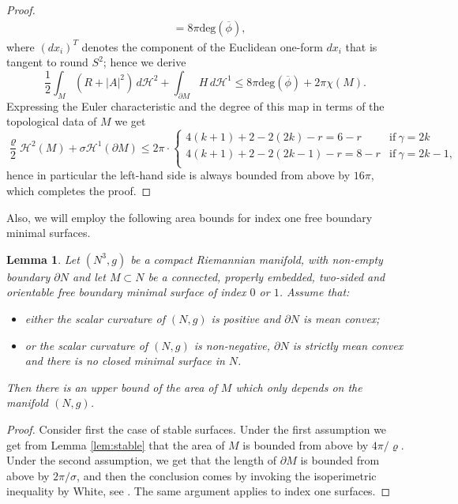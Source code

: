 \documentclass[10pt]{amsart}
\newcounter{cas}
\newtheorem{lem}[thm]{Lemma}
\theoremstyle{definition}
\newcommand{\h}{\mathscr{H}}
\begin{document}
\begin{proof}
\begin{align*}
&=8\pi \text{deg}(\overline{\phi}),
\end{align*}
where $(d x_i)^T$ denotes the component of the Euclidean one-form $dx_i$ that is tangent to round $S^2$; hence we derive
\[
\frac{1}{2}\int_{M}(R+|A|^2)\,d\h^2+\int_{\partial M}H\,d\h^1\leq 8\pi \text{deg}(\overline{\phi})+2\pi\chi(M).
\] Expressing the Euler characteristic and the degree of this map in terms of the topological data of $M$ we get
\[
\frac{\varrho}{2} \h^2(M)+\sigma \h^1(\partial M)\leq 2\pi \cdot
\begin{cases}
4(k+1)+2-2(2k)-r  = 6 -r & \text{if} \ \gamma=2k\\
4(k+1)+2-2(2k-1)-r  = 8 -r & \text{if} \ \gamma=2k-1,\\
\end{cases}
\]
hence in particular the left-hand side is always bounded from above by $16\pi$, which completes the proof.
\end{proof}

Also, we will employ the following area bounds for index one free boundary minimal surfaces.

\begin{lem}\label{lem:area}
Let $(N^3,g)$ be a compact Riemannian manifold, with non-empty boundary $\partial N$ and let $M\subset N$ be a connected, properly embedded, two-sided and orientable free boundary minimal surface of index $0$ or $1$.
Assume that:
\begin{itemize}
\item
\emph{either} the scalar curvature of $(N,g)$ is positive and $\partial N$ is mean convex;
\item
\emph{or} the scalar curvature of $(N,g)$ is non-negative, $\partial N$ is strictly mean convex and there is no \emph{closed} minimal surface in $N$.
\end{itemize}
Then there is an upper bound of the area of $M$ which only depends on the manifold $(N,g)$.
\end{lem}

\begin{proof}
Consider first the case of stable surfaces. Under the first assumption we get from Lemma \ref{lem:stable} that the area of $M$ is bounded from above by $4\pi/\varrho$. Under the second assumption, we get that the length of $\partial M$ is bounded from above by $2\pi/\sigma$, and then the conclusion comes
by invoking the isoperimetric inequality by White, see \cite[Th.\,2.1]{Whi09}. The same argument applies to index one surfaces.
\end{proof}
\end{document}
